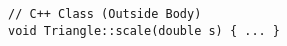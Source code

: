 \documentclass[7pt, twocolumn]{extarticle}
\begin{document}
\begin{small}
\begin{minipage}[h]{4.8cm}
\begin{tcolorbox}
{\begin{lstlisting}[style = mystyle]
// C++ Class (Outside Body)
void Triangle::scale(double s) { ... }

\end{lstlisting}
}
   \end{tcolorbox}


\end{minipage}
\end{small}
\end{document}
